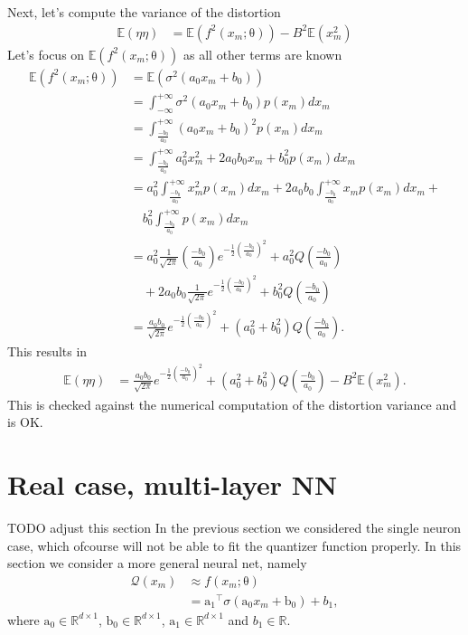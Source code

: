 \documentclass[12pt]{article}
\newcommand{\vect}[1]{\boldsymbol{\mathrm{#1}}}
\newcommand{\TODO}[1]{{\color{red} TODO {#1}}}
\newcommand{\expt}[1]{\mathbb{E}\left(#1\right)}
\theoremstyle{remark}
\begin{document}
Next, let's compute the variance of the distortion
\begin{align}
	\expt{\eta \eta} &= \expt{f^2(x_m; \vect{\theta})} - B^2\expt{x_m^2}
\end{align}
Let's focus on $\expt{f^2(x_m; \vect{\theta})}$ as all other terms are known
\begin{align}
	\expt{f^2(x_m; \vect{\theta})} &= \expt{\sigma^2(a_0 x_m + b_0)}\\
	&=  \int_{-\infty}^{+\infty} \sigma^2(a_0 x_m + b_0) p(x_m) dx_m\\
	&= \int_{\frac{-b_0}{a_0}}^{+\infty} (a_0 x_m + b_0)^2 p(x_m) dx_m \\
	&=  \int_{\frac{-b_0}{a_0}}^{+\infty} a_0^2 x_m^2 + 2 a_0 b_0 x_m + b_0^2 p(x_m) dx_m \\
	&=  a_0^2 \int_{\frac{-b_0}{a_0}}^{+\infty} x_m^2 p(x_m) dx_m +2 a_0 b_0 \int_{\frac{-b_0}{a_0}}^{+\infty} x_m p(x_m) dx_m +\\ & \quad b_0^2 \int_{\frac{-b_0}{a_0}}^{+\infty} p(x_m) dx_m \\
	&= a_0^2 \frac{1}{\sqrt{2\pi}} \left(\frac{-b_0}{a_0}\right) e^{-\frac{1}{2} \left(\frac{-b_0}{a_0}\right)^2} + a_0^2 Q\left(\frac{-b_0}{a_0}\right) \\
	& \quad + 2a_0b_0 \frac{1}{\sqrt{2\pi}} e^{-\frac{1}{2} \left(\frac{-b_0}{a_0}\right)^2} + b_0^2 Q\left(\frac{-b_0}{a_0}\right)\\
	&= \frac{a_0 b_0}{\sqrt{2\pi}} e^{-\frac{1}{2} \left(\frac{-b_0}{a_0}\right)^2} + (a_0^2 + b_0^2) Q\left(\frac{-b_0}{a_0}\right).
\end{align}
This results in 
\begin{align}
	\expt{\eta \eta} &= \frac{a_0 b_0}{\sqrt{2\pi}} e^{-\frac{1}{2} \left(\frac{-b_0}{a_0}\right)^2} + (a_0^2 + b_0^2) Q\left(\frac{-b_0}{a_0}\right)- B^2\expt{x_m^2}.
\end{align}
This is checked against the numerical computation of the distortion variance and is OK.

\section{Real case, multi-layer NN}
\TODO{adjust this section}
In the previous section we considered the single neuron case, which ofcourse will not be able to fit the quantizer function properly. In this section we consider a more general neural net, namely
\begin{align}
	\mathcal{Q}(x_m) &\approx f(x_m; \vect{\theta})\\
	&= \vect{a_1}^{\intercal}\sigma(\vect{a_0}x_m + \vect{b_0}) + b_1,
\end{align}
where $\vect{a_0} \in \mathbb{R}^{d \times 1}$, $\vect{b_0} \in \mathbb{R}^{d \times 1}$, $\vect{a_1} \in \mathbb{R}^{d \times 1}$ and $b_1 \in \mathbb{R}$.
\end{document}
